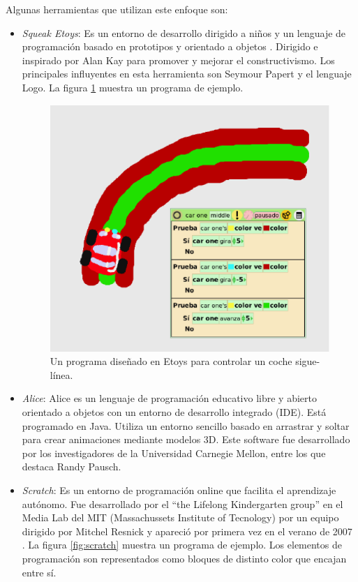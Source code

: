 \documentclass{llncs}
\begin{document}
Algunas herramientas que utilizan este enfoque son:
\begin{itemize}
\item {\em Squeak Etoys}: Es un entorno de desarrollo dirigido a niños y un lenguaje de programación basado en prototipos y orientado a objetos \cite{etoysOnline}. Dirigido e inspirado por Alan Kay para promover y mejorar el constructivismo. Los principales influyentes en esta herramienta son Seymour Papert y el lenguaje Logo. La figura \ref{fig:etoys} muestra un programa de ejemplo.


\begin{figure}[ht]
\begin{center}
\includegraphics[scale=0.4]{images/etoys.eps}
\caption{Un programa diseñado en Etoys para controlar un coche sigue-línea.
\label{fig:etoys}}
\end{center}
\end{figure}

\item {\em Alice}: Alice \cite{AliceOnline} es un lenguaje de programación educativo libre y abierto orientado a objetos con un entorno de desarrollo integrado (IDE). Está programado en Java. Utiliza un entorno sencillo basado en arrastrar y soltar para crear animaciones mediante modelos 3D. Este software fue desarrollado por los investigadores de la Universidad Carnegie Mellon, entre los que destaca Randy Pausch.


\item {\em Scratch}: Es un entorno de programación online \cite{ScatchOnline} que facilita el aprendizaje autónomo. Fue desarrollado por el ``the Lifelong Kindergarten group'' en el Media Lab del MIT (Massachussets Institute of Tecnology) por un equipo dirigido por Mitchel Resnick y apareció por primera vez en el verano de 2007 \cite{resnick2009scratch}. La figura \ref{fig:scratch} muestra un programa de ejemplo. Los elementos de programación son representados como bloques de distinto color que encajan entre sí.
\end{itemize}
\end{document}
